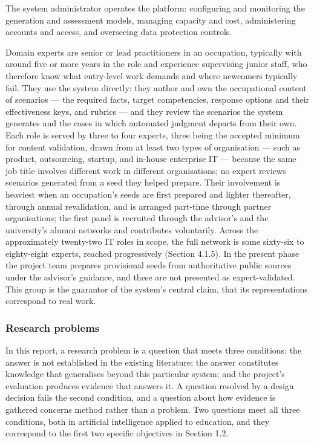 The system administrator operates the platform: configuring and monitoring the generation and assessment models, managing capacity and cost, administering accounts and access, and overseeing data protection controls.

Domain experts are senior or lead practitioners in an occupation, typically with around five or more years in the role and experience supervising junior staff, who therefore know what entry-level work demands and where newcomers typically fail. They use the system directly: they author and own the occupational content of scenarios --- the required facts, target competencies, response options and their effectiveness keys, and rubrics --- and they review the scenarios the system generates and the cases in which automated judgment departs from their own. Each role is served by three to four experts, three being the accepted minimum for content validation\cite{r69}, drawn from at least two types of organisation --- such as product, outsourcing, startup, and in-house enterprise IT --- because the same job title involves different work in different organisations; no expert reviews scenarios generated from a seed they helped prepare. Their involvement is heaviest when an occupation's seeds are first prepared and lighter thereafter, through annual revalidation, and is arranged part-time through partner organisations; the first panel is recruited through the advisor's and the university's alumni networks and contributes voluntarily. Across the approximately twenty-two IT roles in scope, the full network is some sixty-six to eighty-\allowbreak{}eight experts, reached progressively (Section 4.1.5). In the present phase the project team prepares provisional seeds from authoritative public sources under the advisor's guidance, and these are not presented as expert-\allowbreak{}validated. This group is the guarantor of the system's central claim, that its representations correspond to real work.

\subsubsection{Research problems}

In this report, a research problem is a question that meets three conditions: the answer is not established in the existing literature; the answer constitutes knowledge that generalises beyond this particular system; and the project's evaluation produces evidence that answers it. A question resolved by a design decision fails the second condition, and a question about how evidence is gathered concerns method rather than a problem. Two questions meet all three conditions, both in artificial intelligence applied to education, and they correspond to the first two specific objectives in Section 1.2.


